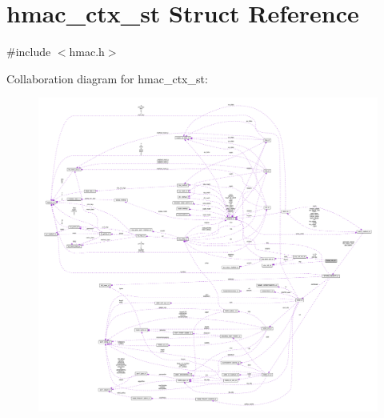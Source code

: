 \hypertarget{structhmac__ctx__st}{}\section{hmac\+\_\+ctx\+\_\+st Struct Reference}
\label{structhmac__ctx__st}


{\ttfamily \#include $<$hmac.\+h$>$}



Collaboration diagram for hmac\+\_\+ctx\+\_\+st\+:\nopagebreak
\begin{figure}[H]
\begin{center}
\leavevmode
\includegraphics[width=350pt]{structhmac__ctx__st__coll__graph}
\end{center}
\end{figure}
